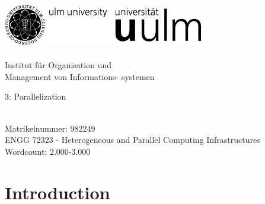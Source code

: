 \documentclass[BCOR20mm,DIV14,10pt,headinclude,footexclude,bibtotoc,liststotoc]{article}
\author{Jonas Otto} \let\theauthor\@author
\newcommand\matrikelnr{982249}
\newcommand\topicNrTitle{3: Parallelization}
\newcommand\theWordCount{2.000-3.000}
\begin{document}
\begin{titlepage}

	\includegraphics[height=1.8cm]{images/logo_100_sw_bildmarke}
	\hfill
	\includegraphics[height=1.8cm]{images/logo_100_sw_wortmarke}\\[1em]


	{\footnotesize
	\\
	\hspace*{8.25cm}Institut f{\"u}r Organisation und\\
	\hspace*{8.25cm}Management von Informations-
	\hspace*{8.25cm}systemen\\[1em]
	}

	\vspace{10em}
	\begin{center}
		\begin{Large}
			\topicNrTitle \\
		\end{Large}
		\vspace{15em}
		\theauthor \\
		Matrikelnummer: \matrikelnr \\
		ENGG 72323 - Heterogeneous and Parallel Computing Infrastructures \\
		Wordcount: \theWordCount
	\end{center}

\end{titlepage}

\section{Introduction}
\end{document}
